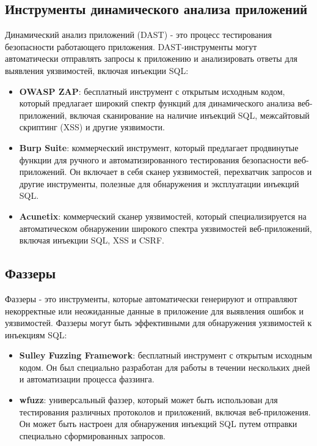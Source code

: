\documentclass[a4paper,12pt]{diplom}
\begin{document}
	 \subsection{Инструменты динамического анализа приложений}
	 
	 Динамический анализ приложений (DAST) - это процесс тестирования безопасности работающего приложения.  DAST-инструменты могут автоматически отправлять запросы к приложению и анализировать ответы для выявления уязвимостей,  включая инъекции SQL:
	 
	 \begin{itemize}
	 	\item \textbf{OWASP ZAP}:  бесплатный инструмент с открытым исходным кодом,  который предлагает широкий спектр функций для динамического анализа веб-приложений,  включая сканирование на наличие инъекций SQL,  межсайтовый скриптинг (XSS) и другие уязвимости. 
	 	\item \textbf{Burp Suite}:  коммерческий инструмент, который предлагает продвинутые функции для ручного и автоматизированного тестирования безопасности веб-приложений.  Он включает в себя сканер уязвимостей,  перехватчик запросов и другие инструменты,  полезные для обнаружения и эксплуатации инъекций SQL.
	 	\item \textbf{Acunetix}:  коммерческий сканер уязвимостей, который специализируется на автоматическом обнаружении широкого спектра уязвимостей веб-приложений,  включая инъекции SQL,  XSS и CSRF. 
	 \end{itemize}
	 
	 \subsection{Фаззеры}
	 
	 Фаззеры - это инструменты, которые автоматически генерируют и отправляют некорректные или неожиданные данные в приложение для выявления ошибок и уязвимостей.  Фаззеры могут быть эффективными для обнаружения уязвимостей к инъекциям SQL:
	 
	 \begin{itemize}
	 	\item \textbf{Sulley Fuzzing Framework}:  бесплатный инструмент с открытым исходным кодом. Он был специально разработан для работы в течении нескольких дней и автоматизации процесса фаззинга. 
	 	\item \textbf{wfuzz}:  универсальный фаззер,  который может быть использован для тестирования различных протоколов и приложений,  включая веб-приложения.  Он может быть настроен для обнаружения инъекций SQL путем отправки специально сформированных запросов. 
	 \end{itemize}
	 
\end{document}
